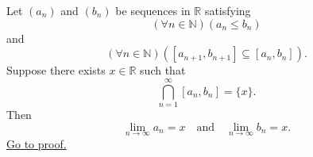 \begin{corollary}
\label{cor:unique-point-in-nested-intervals-is-endpoint-limit}
Let $(a_n)$ and $(b_n)$ be sequences in $\mathbb{R}$ satisfying
\[
  (\forall n\in\mathbb{N})(a_n\leq b_n)
\]
and
\[
  (\forall n\in\mathbb{N})([a_{n+1},b_{n+1}]\subseteq [a_n,b_n]).
\]
Suppose there exists $x\in\mathbb{R}$ such that
\[
  \bigcap_{n=1}^{\infty}[a_n,b_n]=\{x\}.
\]
Then
\[
  \lim_{n\longrightarrow\infty}a_n=x
  \quad\text{and}\quad
  \lim_{n\longrightarrow\infty}b_n=x.
\]
\hyperref[prf:unique-point-in-nested-intervals-is-endpoint-limit]{Go to proof.}
\end{corollary}